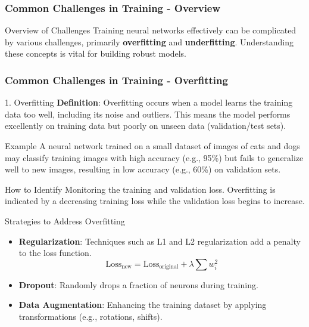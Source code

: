 \documentclass[aspectratio=169]{beamer}
\begin{document}
\begin{frame}[fragile]
    \frametitle{Common Challenges in Training - Overview}
    \begin{block}{Overview of Challenges}
        Training neural networks effectively can be complicated by various challenges, primarily \textbf{overfitting} and \textbf{underfitting}. Understanding these concepts is vital for building robust models.
    \end{block}
\end{frame}

\begin{frame}[fragile]
    \frametitle{Common Challenges in Training - Overfitting}
    \begin{block}{1. Overfitting}
        \textbf{Definition}: Overfitting occurs when a model learns the training data too well, including its noise and outliers. This means the model performs excellently on training data but poorly on unseen data (validation/test sets).
    \end{block}
    
    \begin{exampleblock}{Example}
        A neural network trained on a small dataset of images of cats and dogs may classify training images with high accuracy (e.g., 95\%) but fails to generalize well to new images, resulting in low accuracy (e.g., 60\%) on validation sets.
    \end{exampleblock}
    
    \begin{block}{How to Identify}
        Monitoring the training and validation loss. Overfitting is indicated by a decreasing training loss while the validation loss begins to increase.
    \end{block}
    
    \begin{block}{Strategies to Address Overfitting}
        \begin{itemize}
            \item \textbf{Regularization}: Techniques such as L1 and L2 regularization add a penalty to the loss function.
            \begin{equation}
                \text{Loss}_{\text{new}} = \text{Loss}_{\text{original}} + \lambda \sum w_i^2
            \end{equation}
            \item \textbf{Dropout}: Randomly drops a fraction of neurons during training.
            \item \textbf{Data Augmentation}: Enhancing the training dataset by applying transformations (e.g., rotations, shifts).
        \end{itemize}
    \end{block}
\end{frame}
\end{document}
